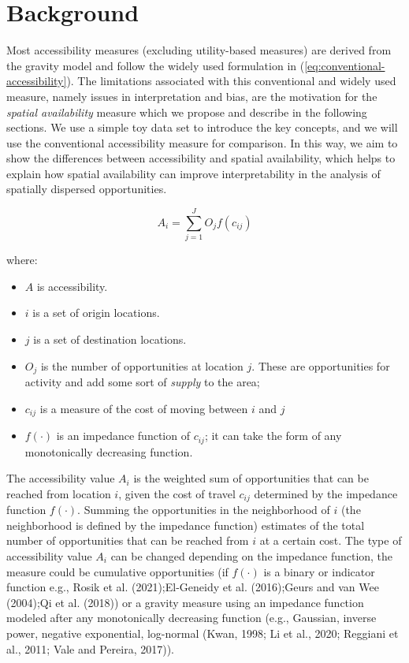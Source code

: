 \documentclass[]{elsarticle} %
\providecommand{\tightlist}{%
  \setlength{\itemsep}{0pt}\setlength{\parskip}{0pt}}
\begin{document}
\hypertarget{background}{%
\section{Background}\label{background}}

Most accessibility measures (excluding utility-based measures) are
derived from the gravity model and follow the widely used formulation in
(\ref{eq:conventional-accessibility}). The limitations associated with
this conventional and widely used measure, namely issues in
interpretation and bias, are the motivation for the \emph{spatial
availability} measure which we propose and describe in the following
sections. We use a simple toy data set to introduce the key concepts,
and we will use the conventional accessibility measure for comparison.
In this way, we aim to show the differences between accessibility and
spatial availability, which helps to explain how spatial availability
can improve interpretability in the analysis of spatially dispersed
opportunities.

\begin{equation}
\label{eq:conventional-accessibility}
A_i = \sum_{j=1}^JO_jf(c_{ij})
\end{equation}

\noindent where:

\begin{itemize}
\tightlist
\item
  \(A\) is accessibility.
\item
  \(i\) is a set of origin locations.
\item
  \(j\) is a set of destination locations.
\item
  \(O_j\) is the number of opportunities at location \(j\). These are
  opportunities for activity and add some sort of \emph{supply} to the
  area;
\item
  \(c_{ij}\) is a measure of the cost of moving between \(i\) and \(j\)
\item
  \(f(\cdot)\) is an impedance function of \(c_{ij}\); it can take the
  form of any monotonically decreasing function.
\end{itemize}

The accessibility value \(A_i\) is the weighted sum of opportunities
that can be reached from location \(i\), given the cost of travel
\(c_{ij}\) determined by the impedance function \(f(\cdot)\). Summing
the opportunities in the neighborhood of \(i\) (the neighborhood is
defined by the impedance function) estimates of the total number of
opportunities that can be reached from \(i\) at a certain cost. The type
of accessibility value \(A_i\) can be changed depending on the impedance
function, the measure could be cumulative opportunities (if \(f(\cdot)\)
is a binary or indicator function e.g., Rosik et al. (2021);El-Geneidy
et al. (2016);Geurs and van Wee (2004);Qi et al. (2018)) or a gravity
measure using an impedance function modeled after any monotonically
decreasing function (e.g., Gaussian, inverse power, negative
exponential, log-normal (Kwan, 1998; Li et al., 2020; Reggiani et al.,
2011; Vale and Pereira, 2017)).
\end{document}
